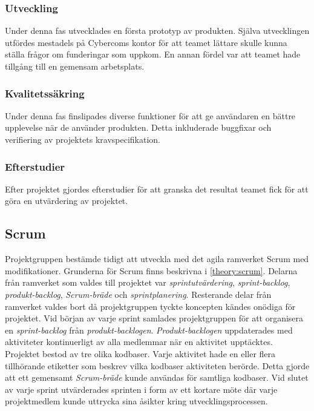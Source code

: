 \subsubsection*{Utveckling}
Under denna fas utvecklades en första prototyp av produkten. Själva utvecklingen utfördes mestadels på Cybercoms kontor för att teamet lättare skulle kunna ställa frågor om funderingar som uppkom. En annan fördel var att teamet hade tillgång till en gemensam arbetsplats.

\subsubsection*{Kvalitetssäkring}
Under denna fas finslipades diverse funktioner för att ge användaren en bättre upplevelse när de använder produkten. Detta inkluderade buggfixar och verifiering av projektets kravspecifikation.

\subsubsection*{Efterstudier}
Efter projektet gjordes efterstudier för att granska det resultat teamet fick för att göra en utvärdering av projektet.

\subsection{Scrum}
\label{main:Scrum}
Projektgruppen bestämde tidigt att utveckla med det agila ramverket Scrum med modifikationer. Grunderna för Scrum finns beskrivna i \ref{theory:scrum}. Delarna från ramverket som valdes till projektet var \textit{sprintutvärdering}, \textit{sprint-backlog}, \textit{produkt-backlog}, \textit{Scrum-bräde} och \textit{sprintplanering}. Resterande delar från ramverket valdes bort då projektgruppen tyckte koncepten kändes onödiga för projektet. Vid början av varje sprint samlades projektgruppen för att organisera en \textit{sprint-backlog} från \textit{produkt-backlogen}. \textit{Produkt-backlogen} uppdaterades med aktiviteter kontinuerligt av alla medlemmar när en aktivitet upptäcktes. Projektet bestod av tre olika kodbaser. Varje aktivitet hade en eller flera tillhörande etiketter som beskrev vilka kodbaser aktiviteten berörde. Detta gjorde att ett gemensamt \textit{Scrum-bräde} kunde användas för samtliga kodbaser. Vid slutet av varje sprint utvärderades sprinten i form av ett kortare möte där varje projektmedlem kunde uttrycka sina åsikter kring utvecklingsprocessen.

